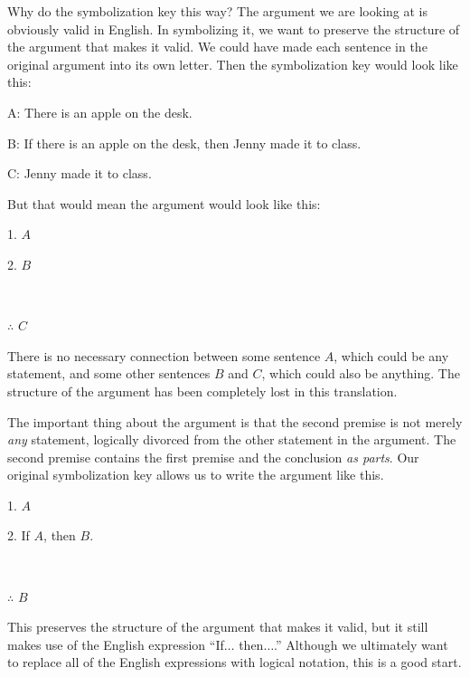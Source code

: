 Why do the symbolization key this way? The argument we are looking at is obviously valid in English. In symbolizing it, we want to preserve the structure of the argument that makes it valid. We could have made each sentence in the original argument into its own letter. Then the symbolization key would look like this:

\begin{ekey}
\item[A:]There is an apple on the desk.
\item[B:]If there is an apple on the desk, then Jenny made it to class.
\item[C:]Jenny made it to class.
\end{ekey}
But that would mean the argument would look like this:
\begin{earg}
\item[1.] $A$
\item[2.] $B$
\item[] \textcolor{white}{.}\sout{\hspace{.05\linewidth}}\textcolor{white}{.}
\item[$\therefore$] $C$
\end{earg}
There is no necessary connection between some sentence $A$, which could be any statement, and some other sentences $B$ and $C$, which could also be anything. The structure of the argument has been completely lost in this translation.

The important thing about the argument is that the second premise is not merely \emph{any} statement, logically divorced from the other statement in the argument. The second premise contains the first premise and the conclusion \emph{as parts}. Our original symbolization key allows us to write the argument like this.

\begin{earg}
\item[1.] $A$
\item[2.] If $A$, then $B$.
\item[] \textcolor{white}{.}\sout{\hspace{.2\linewidth}}\textcolor{white}{.}
\item[$\therefore$] $B$
\end{earg}
This preserves the structure of the argument that makes it valid, but it still makes use of the English expression ``If$\ldots$ then$\ldots$.'' Although we ultimately want to replace all of the English expressions with logical notation, this is a good start.

